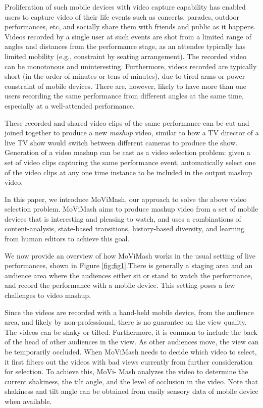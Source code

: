 \documentclass{sig-alternate}
\begin{document}
Proliferation of such mobile devices with video capture capability
has enabled users to capture video of their life events such
as concerts, parades, outdoor performances, etc, and socially share
them with friends and public as it happens. Videos recorded by
a single user at such events are shot from a limited range of angles
and distances from the performance stage, as an attendee typically
has limited mobility (e.g., constraint by seating arrangement).
The recorded video can be monotonous and uninteresting. Furthermore,
videos recorded are typically short (in the order of minutes
or tens of minutes), due to tired arms or power constraint of mobile
devices. There are, however, likely to have more than one users
recording the same performance from different angles at the same
time, especially at a well-attended performance.

These recorded and shared video clips of the same performance
can be cut and joined together to produce a new \textit{mashup} video,
similar to how a TV director of a live TV show would switch between
different cameras to produce the show. Generation of a video
mashup can be cast as a video selection problem: given a set of
video clips capturing the same performance event, automatically
select one of the video clips at any one time instance to be included
in the output mashup video.

In this paper, we introduce MoViMash, our approach to solve
the above video selection problem. MoViMash aims to produce
mashup video from a set of mobile devices that is interesting and
pleasing to watch, and uses a combinations of content-analysis,
state-based transitions, history-based diversity, and learning from
human editors to achieve this goal.

We now provide an overview of how MoViMash works in the
usual setting of live performances, shown in Figure \ref{fig:fig1}.There is generally a staging area and an audience area where the audiences either sit or stand to watch the performance, and record the performance with a mobile device. This setting poses a few challenges to video mashup.

Since the videos are recorded with a hand-held mobile device,
from the audience area, and likely by non-professional, there is no
guarantee on the view quality. The videos can be shaky or tilted.
Furthermore, it is common to include the back of the head of other
audiences in the view. As other audiences move, the view can be
temporarily occluded. When MoViMash needs to decide which
video to select, it first filters out the videos with bad views currently
from further consideration for selection. To achieve this, MoVi-
Mash analyzes the video to determine the current shakiness, the tilt
angle, and the level of occlusion in the video. Note that shakiness and tilt angle can be obtained from easily sensory data of mobile device when available.
\end{document}
